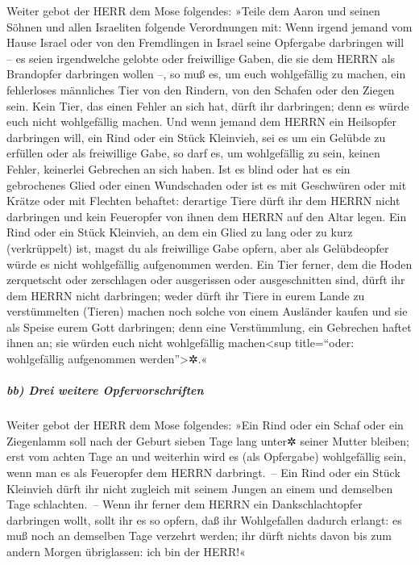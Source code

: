 Weiter gebot der HERR dem Mose folgendes:
»Teile dem Aaron und seinen Söhnen und allen Israeliten
folgende Verordnungen mit: Wenn irgend jemand vom Hause Israel oder von
den Fremdlingen in Israel seine Opfergabe darbringen will -- es seien
irgendwelche gelobte oder freiwillige Gaben, die sie dem HERRN als
Brandopfer darbringen wollen --, so muß es, um euch
wohlgefällig zu machen, ein fehlerloses männliches Tier von den Rindern,
von den Schafen oder den Ziegen sein. Kein Tier, das
einen Fehler an sich hat, dürft ihr darbringen; denn es würde euch nicht
wohlgefällig machen. Und wenn jemand dem HERRN ein
Heilsopfer darbringen will, ein Rind oder ein Stück Kleinvieh, sei es um
ein Gelübde zu erfüllen oder als freiwillige Gabe, so darf es, um
wohlgefällig zu sein, keinen Fehler, keinerlei Gebrechen an sich haben.
Ist es blind oder hat es ein gebrochenes Glied oder einen
Wundschaden oder ist es mit Geschwüren oder mit Krätze oder mit Flechten
behaftet: derartige Tiere dürft ihr dem HERRN nicht darbringen und kein
Feueropfer von ihnen dem HERRN auf den Altar legen. Ein
Rind oder ein Stück Kleinvieh, an dem ein Glied zu lang oder zu kurz
(verkrüppelt) ist, magst du als freiwillige Gabe opfern, aber als
Gelübdeopfer würde es nicht wohlgefällig aufgenommen werden.
Ein Tier ferner, dem die Hoden zerquetscht oder
zerschlagen oder ausgerissen oder ausgeschnitten sind, dürft ihr dem
HERRN nicht darbringen; weder dürft ihr Tiere in eurem Lande zu
verstümmelten (Tieren) machen noch solche von einem
Ausländer kaufen und sie als Speise eurem Gott darbringen; denn eine
Verstümmlung, ein Gebrechen haftet ihnen an; sie würden euch nicht
wohlgefällig machen\textless sup title=``oder: wohlgefällig aufgenommen
werden''\textgreater✲.«

\hypertarget{bb-drei-weitere-opfervorschriften}{%
\subparagraph{bb) Drei weitere
Opfervorschriften}\label{bb-drei-weitere-opfervorschriften}}

Weiter gebot der HERR dem Mose folgendes:
»Ein Rind oder ein Schaf oder ein Ziegenlamm soll nach
der Geburt sieben Tage lang unter✲ seiner Mutter bleiben; erst vom
achten Tage an und weiterhin wird es (als Opfergabe) wohlgefällig sein,
wenn man es als Feueropfer dem HERRN darbringt.~-- Ein
Rind oder ein Stück Kleinvieh dürft ihr nicht zugleich mit seinem Jungen
an einem und demselben Tage schlachten.~-- Wenn ihr
ferner dem HERRN ein Dankschlachtopfer darbringen wollt, sollt ihr es so
opfern, daß ihr Wohlgefallen dadurch erlangt: es muß noch
an demselben Tage verzehrt werden; ihr dürft nichts davon bis zum andern
Morgen übriglassen: ich bin der HERR!«

